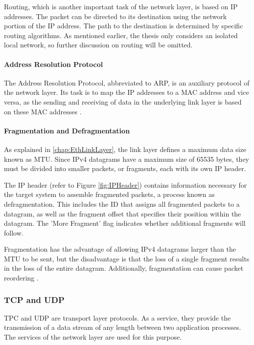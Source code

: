 Routing, which is another important task of the network layer, is based on IP addresses. The packet can be directed to its destination using the network portion of the IP address. The path to the destination is determined by specific routing algorithms. As mentioned earlier, the thesis only considers an isolated local network, so further discussion on routing will be omitted.


\paragraph{Address Resolution Protocol}

The Address Resolution Protocol, abbreviated to ARP, is an auxiliary protocol of the network layer. Its task is to map the IP addresses to a MAC address and vice versa, as the sending and receiving of data in the underlying link layer is based on these MAC addresses \cite{Weigel2021}.


\paragraph{Fragmentation and Defragmentation} \label{chap:frag}

As explained in \ref{chap:EthLinkLayer}, the link layer defines a maximum data size known as MTU. Since IPv4 datagrams have a maximum size of 65535 bytes, they must be divided into smaller packets, or fragments, each with its own IP header.

The IP header (refer to Figure \ref{fig:IPHeader}) contains information necessary for the target system to assemble fragmented packets, a process known as defragmentation. This includes the ID that assigns all fragmented packets to a datagram, as well as the fragment offset that specifies their position within the datagram. The 'More Fragment' flag indicates whether additional fragments will follow.

Fragmentation has the advantage of allowing IPv4 datagrams larger than the MTU to be sent, but the disadvantage is that the loss of a single fragment results in the loss of the entire datagram. Additionally, fragmentation can cause packet reordering \cite{IPFragDetail}.

\subsubsection{TCP and UDP}
TPC and UDP are transport layer protocols. As a service, they provide the transmission of a data stream of any length between two application processes. The services of the network layer are used for this purpose.

